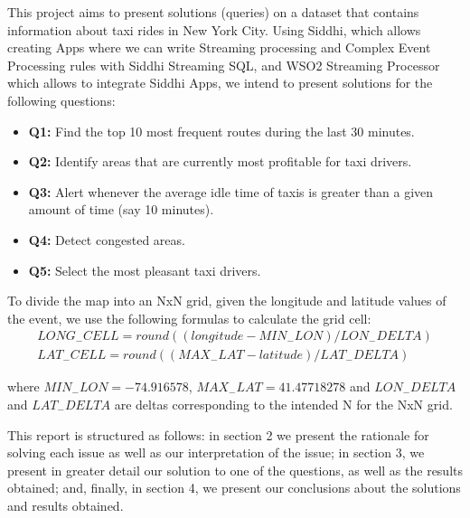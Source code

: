 This project aims to present solutions (queries) on a dataset that contains information about taxi rides in New York City. Using Siddhi, which allows creating Apps where we can write Streaming processing and Complex Event Processing rules with Siddhi Streaming SQL, and WSO2 Streaming Processor which allows to integrate Siddhi Apps, we intend to present solutions for the following questions: 

\begin{itemize}
\item \textbf{Q1:} Find the top 10 most frequent routes during the last 30 minutes. 
\item \textbf{Q2:} Identify areas that are currently most profitable for taxi drivers.
\item \textbf{Q3:} Alert whenever the average idle time of taxis is greater than a given amount of time (say 10 minutes).
\item \textbf{Q4:} Detect congested areas.
\item \textbf{Q5:} Select the most pleasant taxi drivers. 
\end{itemize}

To divide the map into an NxN grid, given the longitude and latitude values of the event, we use the following formulas to calculate the grid cell:
\begin{align}
LONG_-CELL = round((longitude - MIN_-LON) / LON_-DELTA) \\
LAT_-CELL = round((MAX_-LAT - latitude) / LAT_-DELTA)
\end{align}

where $MIN_-LON = -74.916578$, $MAX_-LAT = 41.47718278$ and $LON_-DELTA$ and $LAT_-DELTA$ are deltas corresponding to the intended N for the NxN grid. \par
This report is structured as follows: in section 2 we present the rationale for solving each issue as well as our interpretation of the issue; in section 3, we present in greater detail our solution to one of the questions, as well as the results obtained; and, finally, in section 4, we present our conclusions about the solutions and results obtained. 